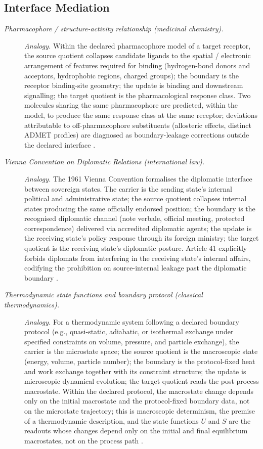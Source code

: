 \subsection*{ Interface Mediation}
\begingroup\small
\begin{description}
\item[\emph{Pharmacophore / structure-activity relationship
(medicinal chemistry).}] \textit{Analogy.}
Within the declared pharmacophore model of a target
receptor, the source quotient collapses candidate ligands
to the spatial / electronic arrangement of features
required for binding (hydrogen-bond donors and acceptors,
hydrophobic regions, charged groups); the boundary is the
receptor binding-site geometry; the update is binding
and downstream signalling; the target quotient is the
pharmacological response class.  Two molecules sharing
the same pharmacophore are predicted, within the model,
to produce the same response class at the same receptor;
deviations attributable to off-pharmacophore substituents
(allosteric effects, distinct ADMET profiles) are
diagnosed as boundary-leakage corrections outside the
declared interface \citep{Wermuth1998IUPACGlossary}.

\item[\emph{Vienna Convention on Diplomatic Relations
(international law).}] \textit{Analogy.}
The 1961 Vienna Convention formalises the diplomatic
interface between sovereign states.  The carrier is the
sending state's internal political and administrative
state; the source quotient collapses internal states
producing the same officially endorsed position; the
boundary is the recognised diplomatic channel (note
verbale, official meeting, protected correspondence)
delivered via accredited diplomatic agents; the update
is the receiving state's policy response through its
foreign ministry; the target quotient is the receiving
state's diplomatic posture.  Article 41 explicitly
forbids diplomats from interfering in the receiving
state's internal affairs, codifying the prohibition on
source-internal leakage past the diplomatic boundary
\citep{ViennaConventionDiplomatic1961}.

\item[\emph{Thermodynamic state functions and boundary
protocol (classical thermodynamics).}] \textit{Analogy.}
For a thermodynamic system following a declared
boundary protocol (e.g., quasi-static, adiabatic, or
isothermal exchange under specified constraints on
volume, pressure, and particle exchange), the carrier
is the microstate space; the source quotient is the
macroscopic state (energy, volume, particle number);
the boundary is the protocol-fixed heat and work
exchange together with its constraint structure; the
update is microscopic dynamical evolution; the target
quotient reads the post-process macrostate.  Within the
declared protocol, the macrostate change depends only
on the initial macrostate and the protocol-fixed
boundary data, not on the microstate trajectory; this is macroscopic determinism,
the premise of a thermodynamic description, and the state functions
\(U\) and \(S\) are the readouts whose changes depend only on the
initial and final equilibrium macrostates, not on the process path \citep{Callen1985Thermodynamics}.
\end{description}

